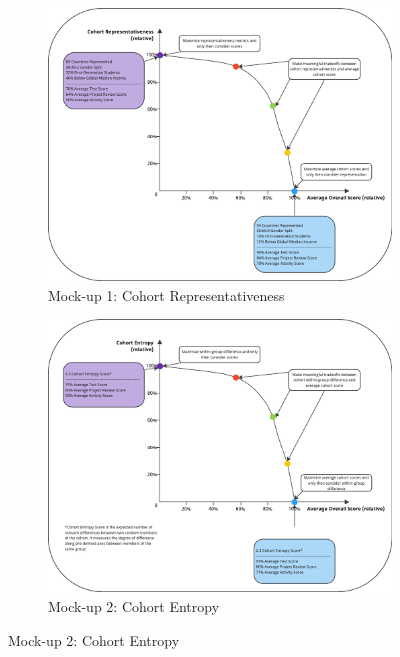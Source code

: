 \begin{figure}[htbp]
    \centering
    \begin{subfigure}[b]{0.3\textwidth}
        \includegraphics[width=\textwidth]{figures/codesign/representativeness.png}
        \caption{Mock-up 1: Cohort Representativeness}
        \label{fig:representativeness}
    \end{subfigure}
    \hfill
    \begin{subfigure}[b]{0.3\textwidth}
        \includegraphics[width=\textwidth]{figures/codesign/entropy.png}
        \caption{Mock-up 2: Cohort Entropy}
        \label{fig:entropy}
    \end{subfigure}

\end{figure}

